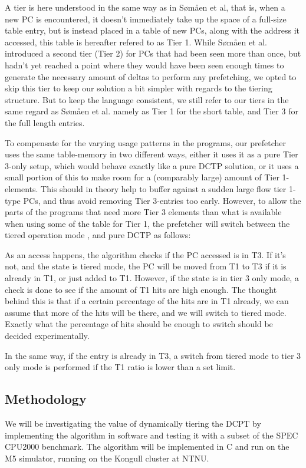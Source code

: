 A tier is here understood in the same way as in Sømåen et al, that is, when
a new PC is encountered, it doesn't immediately take up the space of a full-size
table entry, but is instead placed in a table of new PCs, along with the address it
accessed, this table is hereafter refered to as Tier 1. While Sømåen et al. introduced
a second tier (Tier 2) for PCs that had been seen more than once, but hadn't yet
reached a point where they would have been seen enough times to generate the necessary
amount of deltas to perform any prefetching, we opted to skip this tier to keep our
solution a bit simpler with regards to the tiering structure. But to keep the language
consistent, we still refer to our tiers in the same regard as Sømåen et al. namely as Tier 1
for the short table, and Tier 3 for the full length entries.

To compensate for the varying usage patterns in the programs, our prefetcher uses the same
table-memory in two different ways, either it uses it as a pure Tier 3-only setup, which
would behave exactly like a pure DCTP solution, or it uses a small portion of this to make
room for a (comparably large) amount of Tier 1-elements. This should in theory help to buffer
against a sudden large flow tier 1-type PCs, and thus avoid removing Tier 3-entries too early.
However, to allow the parts of the programs that need more Tier 3 elements than what is available
when using some of the table for Tier 1, the prefetcher will switch between the tiered operation mode
, and pure DCTP as follows:

As an access happens, the algorithm checks if the PC accessed is in T3. If it's
not, and the state is tiered mode, the PC will be moved from T1 to T3 if it is
already in T1, or just added to T1. However, if the state is in tier 3 only
mode, a check is done to see if the amount of T1 hits are high enough. The
thought behind this is that if a certain percentage of the hits are in T1
already, we can assume that more of the hits will be there, and we will switch
to tiered mode. Exactly what the percentage of hits should be enough to
switch should be decided experimentally.

In the same way, if the entry is already in T3, a switch from tiered mode to
tier 3 only mode is performed if the T1 ratio is lower than a set limit.


\subsection{Methodology}

We will be investigating the value of dynamically tiering the DCPT by
implementing the algorithm in software and testing it with a subset of the SPEC
CPU2000 benchmark.  The algorithm will be implemented in C and run on the M5
simulator, running on the Kongull cluster at NTNU.
